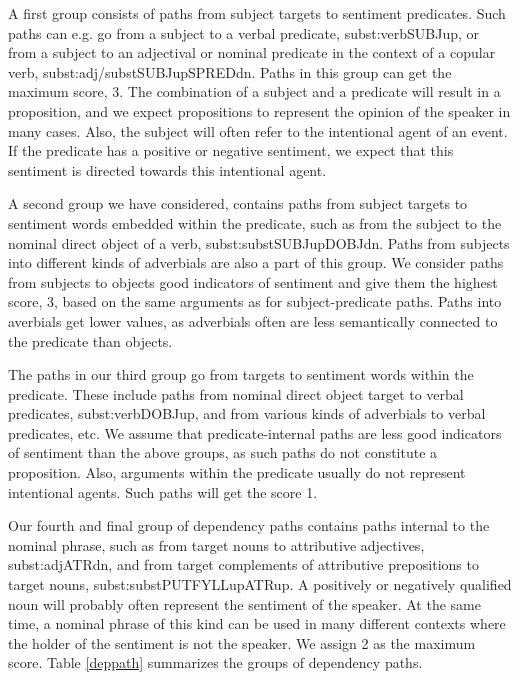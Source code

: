 \documentclass[11pt]{article}
\begin{document}
A first group consists of paths from subject targets to sentiment predicates. Such paths can e.g. go from a subject to a verbal predicate, subst:verb{\textunderscore}{\textunderscore}SUBJ{\textunderscore}up, or from a subject to an adjectival or nominal predicate in the context of a copular verb, subst:adj/subst{\textunderscore}{\textunderscore}SUBJ{\textunderscore}up{\textunderscore}{\textunderscore}SPRED{\textunderscore}dn. Paths in this group can get the maximum score, 3. The combination of a subject and a predicate will result in a proposition, and we expect propositions to represent the opinion of the speaker in many cases. Also, the subject will often refer to the intentional agent of an event. If the predicate has a positive or negative sentiment, we expect that this sentiment is directed towards this intentional agent. 

A second group we have considered, contains paths from subject targets to sentiment words embedded within the predicate, such as from the subject to the nominal direct object of a verb, subst:subst{\textunderscore}{\textunderscore}SUBJ{\textunderscore}up{\textunderscore}{\textunderscore}DOBJ{\textunderscore}dn. Paths from subjects into different kinds of adverbials are also a part of this group. We consider paths from subjects to objects good indicators of sentiment and give them the highest score, 3, based on the same arguments as for subject-predicate paths. Paths into averbials get lower values, as adverbials often are less semantically connected to the predicate than objects.

The paths in our third group go from targets to sentiment words within the predicate. These include paths from nominal direct object target to verbal predicates, subst:verb{\textunderscore}{\textunderscore}DOBJ{\textunderscore}up, and from various kinds of adverbials to verbal predicates, etc. We assume that predicate-internal paths are less good indicators of sentiment than the above groups, as such paths do not constitute a proposition. Also, arguments within the predicate usually do not represent intentional agents. Such paths will get the score 1.

Our fourth and final group of dependency paths contains paths internal to the nominal phrase, such as from target nouns to attributive adjectives, subst:adj{\textunderscore}{\textunderscore}ATR{\textunderscore}dn, and from target complements of attributive prepositions to target nouns, subst:subst{\textunderscore}{\textunderscore}PUTFYLL{\textunderscore}up{\textunderscore}{\textunderscore}ATR{\textunderscore}up. A positively or negatively qualified noun will probably often represent the sentiment of the speaker. At the same time, a nominal phrase of this kind can be used in many different contexts where the holder of the sentiment is not the speaker. We assign 2 as the maximum score. Table \ref{deppath} summarizes the groups of dependency paths.
\end{document}
